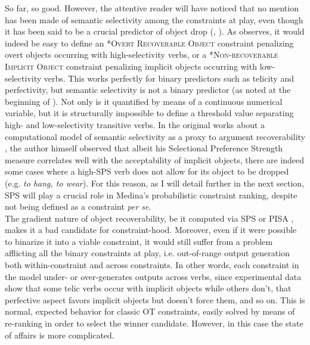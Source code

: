 So far, so good. However, the attentive reader will have noticed that no mention has been made of semantic selectivity among the constraints at play, even though it has been said to be a crucial predictor of object drop (, ). As \textcite[76]{Medina2007} observes, it would indeed be easy to define an \textsc{*Overt Recoverable Object} constraint penalizing overt objects occurring with high-selectivity verbs, or a \textsc{*Non-recoverable Implicit Object} constraint penalizing implicit objects occurring with low-selectivity verbs. This works perfectly for binary predictors such as telicity and perfectivity, but semantic selectivity is not a binary predictor (as noted at the beginning of ). Not only is it quantified by means of a continuous numerical variable, but it is structurally impossible to define a threshold value separating high- and low-selectivity transitive verbs. In the original works about a computational model of semantic selectivity as a proxy to argument recoverability \parencite{Resnik1993, Resnik1996}, the author himself observed that albeit his Selectional Preference Strength measure correlates well with the acceptability of implicit objects, there are indeed some cases where a high-SPS verb does not allow for its object to be dropped (e.g. \textit{to hang, to wear}). For this reason, as I will detail further in the next section, SPS will play a crucial role in Medina's probabilistic constraint ranking, despite not being defined as a constraint \textit{per se}.\\
The gradient nature of object recoverability, be it computed via SPS \parencite{Resnik1993, Resnik1996} or PISA \parencite{CappelliLenciPISA}, makes it a bad candidate for constraint-hood. Moreover, even if it were possible to binarize it into a viable constraint, it would still suffer from a problem afflicting all the binary constraints at play, i.e. out-of-range output generation both within-constraint and across constraints. In other words, each constraint in the model under- or over-generates outputs across verbs, since experimental data show that some telic verbs occur with implicit objects while others don't, that perfective aspect favors implicit objects but doesn't force them, and so on. This is normal, expected behavior for classic OT constraints, easily solved by means of re-ranking in order to select the winner candidate. However, in this case the state of affairs is more complicated.\\
